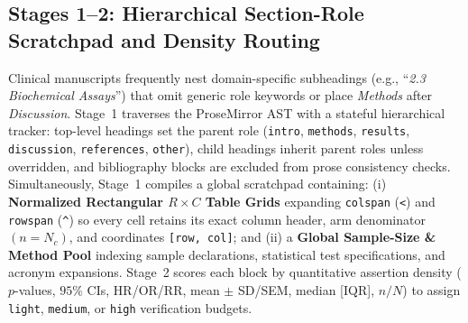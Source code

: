 \documentclass[11pt,a4paper]{article}
\begin{document}
\subsection{Stages 1--2: Hierarchical Section-Role Scratchpad and Density Routing}
Clinical manuscripts frequently nest domain-specific subheadings (e.g., ``\emph{2.3 Biochemical Assays}'') that omit generic role keywords or place \emph{Methods} after \emph{Discussion}. Stage~1 traverses the ProseMirror AST with a stateful hierarchical tracker: top-level headings set the parent role (\texttt{intro}, \texttt{methods}, \texttt{results}, \texttt{discussion}, \texttt{references}, \texttt{other}), child headings inherit parent roles unless overridden, and bibliography blocks are excluded from prose consistency checks. Simultaneously, Stage~1 compiles a global scratchpad containing: (i) \textbf{Normalized Rectangular $R \times C$ Table Grids} expanding \texttt{colspan} (\texttt{<}) and \texttt{rowspan} (\texttt{\^{}}) so every cell retains its exact column header, arm denominator $(n=N_c)$, and coordinates \texttt{[row, col]}; and (ii) a \textbf{Global Sample-Size \& Method Pool} indexing sample declarations, statistical test specifications, and acronym expansions. Stage~2 scores each block by quantitative assertion density ($p$-values, $95\%$ CIs, HR/OR/RR, mean $\pm$ SD/SEM, median [IQR], $n/N$) to assign \texttt{light}, \texttt{medium}, or \texttt{high} verification budgets.
\end{document}
